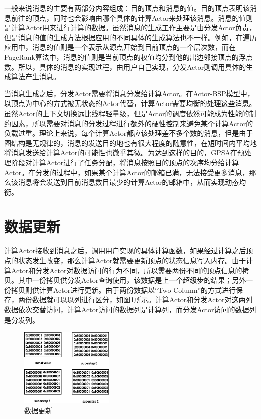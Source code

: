 一般来说消息的主要有两部分内容组成：目的顶点和消息的值。目的顶点表明该消息前往的顶点，同时也会影响由哪个具体的计算Actor来处理该消息。消息的值则是计算Actor用来进行计算的数据。虽然消息的生成工作主要是由分发Actor负责，但是消息的值的生成方法根据应用的不同具体的生成算法也不一样。例如，在遍历应用中，消息的值则是一个表示从源点开始到目前顶点的一个层次数，而在PageRank算法中，消息的值则是当前顶点的权值均分到他的出边邻接顶点的浮点数。所以，具体的消息的实现过程，由用户自己实现，分发Actor则调用具体的生成算法产生消息。

当消息生成之后，分发Actor需要将消息分发给计算Actor。在Actor-BSP模型中，以顶点为中心的方式被无状态的Actor代替，计算Actor需要均衡的处理这些消息。虽然Actor的上下文切换远比线程轻量级，但是Actor的调度依然可能成为性能的制约因素，所以需要对消息的分发过程进行额外的硬性控制来避免某个计算Actor的负载过重。理论上来说，每个计算Actor都应该处理差不多个数的消息，但是由于图结构是无规律的，消息的发送目的地也有很大程度的随意性，在短时间内平均地将消息发送给计算Actor的可能性也微乎其微。为达到这样的目的，GPSA在预处理阶段对计算Actor进行了任务分配，将消息按照目的顶点的次序均分给计算Actor。在分发的过程中，如果某个计算Actor的邮箱已满，无法接受更多消息，那么该消息将会发送到目前消息数目最少的计算Actor的邮箱中，从而实现动态均衡。

\section{数据更新}
计算Actor接收到消息之后，调用用户实现的具体计算函数，如果经过计算之后顶点的状态发生改变，那么计算Actor就需要更新顶点的状态信息写入内存。由于计算Actor和分发Actor对数据访问的行为不同，所以需要两份不同的顶点信息的拷贝。其中一份拷贝供分发Actor查询使用，该数据是上一个超级步的结果；另外一份拷贝则供计算Actor进行更新。由于两份数据以“Two-Column”的方式进行保存，两份数据就可以以列进行区分，如图\ref{fig:vu}所示。计算Actor和分发Actor对这两列数据依次交替访问，计算Actor访问的数据列是计算列，而分发Actor访问的数据列是分发列。

\begin{figure}[htbp]
\centering
\includegraphics[width=0.4\textwidth]{myfigures/valueupdating.eps}
\caption{数据更新}\label{fig:vu}
\vspace{\baselineskip}
\end{figure}

